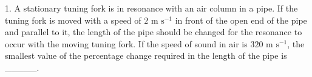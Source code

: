  1. A stationary tuning fork is in resonance with an air column in a pipe. If the tuning fork is moved with a speed of \(2\text{ m s}^{-1}\) in front of the open end of the pipe and parallel to it, the length of the pipe should be changed for the resonance to occur with the moving tuning fork. If the speed of sound in air is \(320\text{ m s}^{-1}\), the smallest value of the percentage change required in the length of the pipe is _____.

\begin{center}
\end{center}